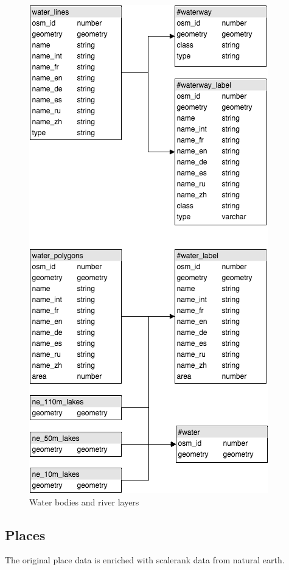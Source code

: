 \begin{figure}[h]
  \includegraphics[scale=0.6]{images/water_layer.png}
  \caption{Water bodies and river layers}
\end{figure}

\newpage
\subsection{Places}
The original \osm{} place data is enriched with scalerank data
from natural earth.

